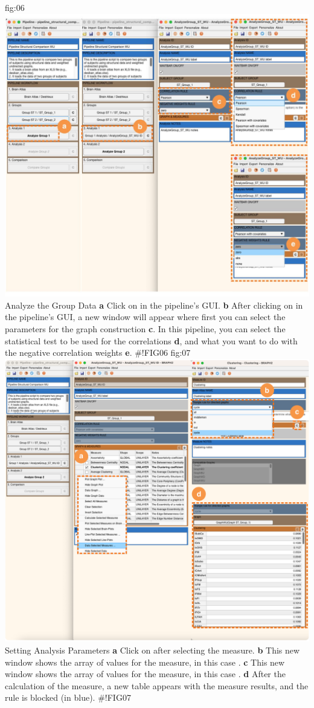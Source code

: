 \documentclass[justified]{tufte-handout}
\begin{document}
{fig:06}
{\includegraphics{fig06.jpg}
}
{Analyze the Group Data}
{
	{\bf a} Click on  in the pipeline's GUI.
    {\bf b} After clicking on  in the pipeline's GUI, a new window will appear where first you can select the parameters for the graph construction {\bf c}. In this pipeline, you can select the statistical test to be used for the correlations {\bf d}, and what you want to do with the negative correlation weights {\bf e}.
}
#!FIG06
{fig:07}
{\includegraphics{fig07.jpg}
}
{Setting Analysis Parameters}
{
	{\bf a} Click on  after selecting the measure.
	{\bf b} This new window shows the array of values for the measure, in this case .
 	{\bf c} This new window shows the array of values for the measure, in this case .
 	{\bf d} After the calculation of the measure, a new table appears with the measure results, and the rule is blocked (in blue).
}
#!FIG07
 
\end{document}
